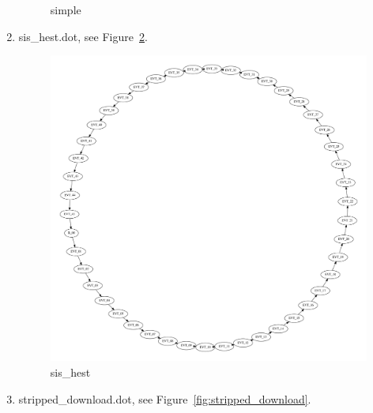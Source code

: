\documentclass[12pt,a4paper]{report}
\begin{document}
\begin{enumerate}
\begin{figure}
        \caption{simple}
        \label{fig:simple}
    \end{figure}
\item sis\_hest.dot, see Figure~\ref{fig:sis_hest}.
    \begin{figure}
        \centering 
        \includegraphics*[width=1.0\textwidth,keepaspectratio]{TestPattern/sis_hest.pdf}
        \caption{sis\_hest}
        \label{fig:sis_hest}
    \end{figure}
\item stripped\_download.dot, see Figure~\ref{fig:stripped_download}.
    \begin{figure}
        \centering 

\end{figure}
\end{enumerate}
\end{document}

